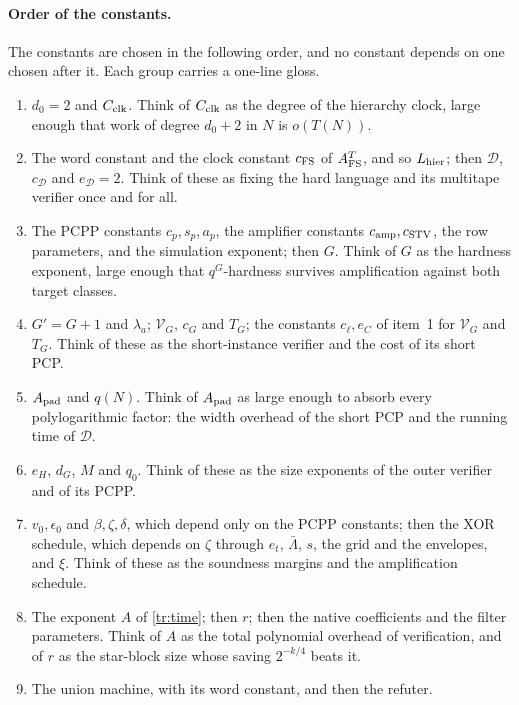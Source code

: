 \documentclass[11pt,letterpaper]{article}
\theoremstyle{definition}
\theoremstyle{remark}
\begin{document}
\paragraph{Order of the constants.}
The constants are chosen in the following order, and no constant
depends on one chosen after it. Each group carries a one-line gloss.
\begin{enumerate}[label=(\arabic*)]
\item $d_0=2$ and $C_{\rm clk}$. Think of $C_{\rm clk}$ as the degree
of the hierarchy clock, large enough that work of degree $d_0+2$ in $N$
is $o(T(N))$.

\item The word constant and the clock constant $c_{\rm FS}$ of
$A^T_{\rm FS}$, and so $L_{\rm hier}$; then $\mathcal D$,
$c_{\mathcal D}$ and $e_{\mathcal D}=2$. Think of these as fixing the
hard language and its multitape verifier once and for all.

\item The PCPP constants $c_p,s_p,a_p$, the amplifier constants
$c_{\rm amp},c_{\rm STV}$, the row parameters, and the simulation
exponent; then $G$. Think of $G$ as the hardness exponent, large enough
that $q^G$-hardness survives amplification against both target
classes.

\item $G'=G+1$ and $\lambda_a$; $\mathcal V_G$, $c_G$ and $T_G$; the
constants $c_\ell,e_C$ of item~1 for $\mathcal V_G$ and $T_G$. Think of
these as the short-instance verifier and the cost of its short PCP.

\item $A_{\rm pad}$ and $q(N)$. Think of $A_{\rm pad}$ as large enough
to absorb every polylogarithmic factor: the width overhead of the short
PCP and the running time of $\mathcal D$.

\item $e_H$, $d_G$, $M$ and $q_0$. Think of these as the size exponents
of the outer verifier and of its PCPP.

\item $v_0,\epsilon_0$ and $\beta,\zeta,\delta$, which depend only on
the PCPP constants; then the XOR schedule, which depends on $\zeta$
through $e_t$, $\bar\Lambda$, $s$, the grid and the envelopes, and
$\xi$. Think of these as the soundness margins and the amplification
schedule.

\item The exponent $A$ of \eqref{tr:time}; then $r$; then the native
coefficients and the filter parameters. Think of $A$ as the total
polynomial overhead of verification, and of $r$ as the star-block size
whose saving $2^{-k/4}$ beats it.

\item The union machine, with its word constant, and then the refuter.
\end{enumerate}
\end{document}
